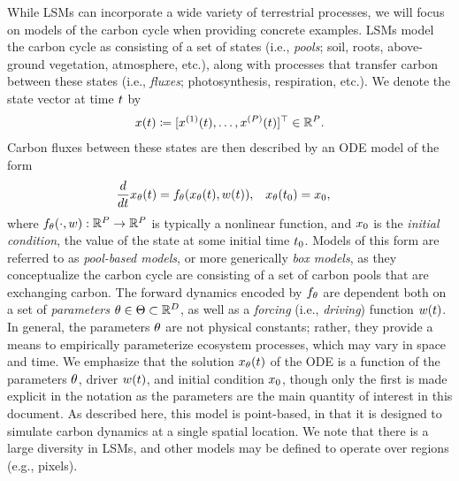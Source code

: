 \documentclass[12pt]{article}
\begin{document}
While LSMs can incorporate a wide 
variety of terrestrial processes, we will focus on models of the carbon cycle when providing concrete examples. 
LSMs model the carbon cycle as consisting of a set of states (i.e., \textit{pools}; soil, roots, above-ground vegetation, atmosphere, etc.),
along with processes that transfer carbon between these states (i.e., \textit{fluxes}; photosynthesis, respiration, etc.). 
We denote the state vector at time $\Time$ by 
\begin{align}
\state(\Time) \Def [\indexState[1]{\state}(\Time), \dots, \indexState[\dimState]{\state}(\Time)]^\top \in \R^{\dimState}.
\end{align}
Carbon fluxes between these states are then described by an ODE model of the form
\begin{align}
&\frac{d}{d\Time} \state_{\Par}(\Time) = \funcODE_{\Par}(\state_{\Par}(\Time), \forcing(\Time)), &&\state_{\Par}(\timeInitState) = \stateInit, \label{ode}
\end{align}
where $\funcODE_{\Par}(\cdot, \forcing): \R^{\dimState} \to \R^{\dimState}$ is typically a nonlinear function, and $\stateInit$ is the \textit{initial condition}, 
the value of the state at some initial time $\timeInitState$. Models of this form are referred to as \textit{pool-based models}, or more generically 
\textit{box models}, as they conceptualize the carbon cycle are consisting of a set of carbon pools that are exchanging carbon. 
The forward dynamics encoded by $\funcODE_{\Par}$ are dependent both on a set of 
\textit{parameters} $\Par \in \parSpace \subset \R^{\dimPar}$, as well as a \textit{forcing} (i.e., \textit{driving}) function $\forcing(\Time)$.
In general, the parameters $\Par$ are not physical constants; rather, they provide a means to empirically parameterize ecosystem 
processes, which may vary in space and time.   
We emphasize that the solution $\state_{\Par}(\Time)$ of the ODE is a function of the parameters $\Par$, driver $\forcing(\Time)$, and 
initial condition $\stateInit$, though only the first is made explicit in the notation as the parameters are the main quantity of interest in this document.
As described here, this model is point-based, in that it is designed to simulate carbon dynamics at a single spatial location. We note that 
there is a large diversity in LSMs, and other models may be defined to operate over regions (e.g., pixels). 

\end{document}
